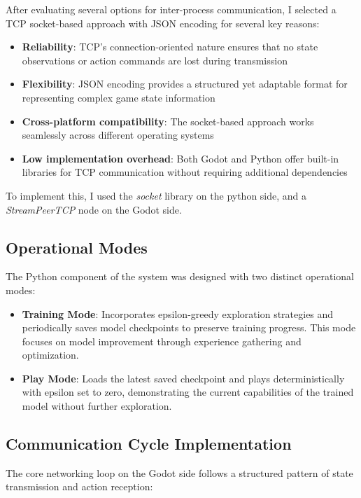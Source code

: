 After evaluating several options for inter-process communication, I selected a TCP socket-based approach with JSON encoding for several key reasons:

\begin{itemize}
    \item \textbf{Reliability}: TCP's connection-oriented nature ensures that no state observations or action commands are lost during transmission
    \item \textbf{Flexibility}: JSON encoding provides a structured yet adaptable format for representing complex game state information
    \item \textbf{Cross-platform compatibility}: The socket-based approach works seamlessly across different operating systems
    \item \textbf{Low implementation overhead}: Both Godot and Python offer built-in libraries for TCP communication without requiring additional dependencies
\end{itemize}

To implement this, I used the \textit{socket} library on the python side, and a \textit{StreamPeerTCP} node on the Godot side.

\subsection{Operational Modes}

The Python component of the system was designed with two distinct operational modes:

\begin{itemize}
    \item \textbf{Training Mode}: Incorporates epsilon-greedy exploration strategies and periodically saves model checkpoints to preserve training progress. This mode focuses on model improvement through experience gathering and optimization.
    \item \textbf{Play Mode}: Loads the latest saved checkpoint and plays deterministically with epsilon set to zero, demonstrating the current capabilities of the trained model without further exploration.
\end{itemize}

\subsection{Communication Cycle Implementation}

The core networking loop on the Godot side follows a structured pattern of state transmission and action reception:

